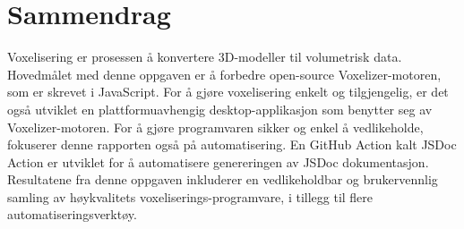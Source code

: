 \section*{Sammendrag}
Voxelisering er prosessen å konvertere 3D-modeller til volumetrisk data. Hovedmålet med denne oppgaven er å forbedre open-source Voxelizer-motoren, som er skrevet i JavaScript. For å gjøre voxelisering enkelt og tilgjengelig, er det også utviklet en plattformuavhengig desktop-applikasjon som benytter seg av Voxelizer-motoren. For å gjøre programvaren sikker og enkel å vedlikeholde, fokuserer denne rapporten også på automatisering. En GitHub Action kalt JSDoc Action er utviklet for å automatisere genereringen av JSDoc dokumentasjon. Resultatene fra denne oppgaven inkluderer en vedlikeholdbar og brukervennlig samling av høykvalitets voxeliserings-programvare, i tillegg til flere automatiseringsverktøy.


